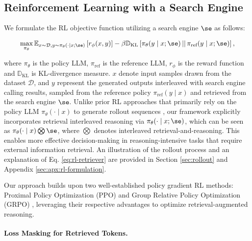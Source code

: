 \subsection{Reinforcement Learning with a Search Engine}

We formulate the RL objective function utilizing a search engine $\se$ as follows:

\begin{gather}\label{eq:rl-retriever}
    \max_{\pi_\theta} \mathbb{E}_{x \sim \mathcal{D}, y \sim \pi_{\theta}(\cdot \mid x; \se)} 
\left[ r_{\phi}(x, y) \right] 
- \beta \mathbb{D}_{\text{KL}} \left[ \pi_{\theta}(y \mid x; \se) \,||\, \pi_{\text{ref}}(y \mid x; \se) \right],
\end{gather}

where $\pi_{\theta}$ is the policy LLM, $\pi_{\text{ref}}$ is the reference LLM, $r_{\phi}$ is the reward function and $\mathbb{D}_{\text{KL}}$ is KL-divergence measure.
\( x \) denote input samples drawn from the dataset \( \mathcal{D} \), and \( y \) represent the generated outputs interleaved with search engine calling results, sampled from the reference policy \( \pi_{\text{ref}}(y \mid x) \) and retrieved from the search engine $\se$. 
Unlike prior RL approaches that primarily rely on the policy LLM $\pi_{\theta}(\cdot \mid x)$ to generate rollout sequences \citep{rafailov2023direct, ouyang2022training}, our framework explicitly incorporates retrieval interleaved reasoning via $\pi_{\theta}(\cdot \mid x; \se)$, which can be seen as $\pi_{\theta}(\cdot \mid x) \bigotimes \se$, where $\bigotimes$ denotes interleaved retrieval-and-reasoning.
This enables more effective decision-making in reasoning-intensive tasks that require external information retrieval. An illustration of the rollout process and an explanation of Eq. \ref{eq:rl-retriever} are provided in Section \ref{sec:rollout} and Appendix \ref{sec:apx:rl-formulation}.

Our approach builds upon two well-established policy gradient RL methods: Proximal Policy Optimization (PPO) \citep{schulman2017proximal} and Group Relative Policy Optimization (GRPO) \citep{shao2024deepseekmath,guo2025deepseek}, leveraging their respective advantages to optimize retrieval-augmented reasoning.

\paragraph{Loss Masking for Retrieved Tokens.}\label{sec:kl-mask}

